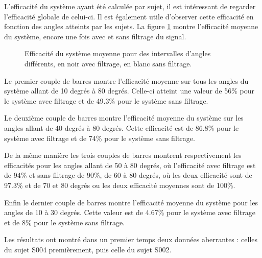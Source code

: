 \documentclass[letterpaper, twoside, 12pt, memoire, creativecommons, hyperref]{thETS}
\begin{document}
L'efficacité du système ayant été calculée par sujet, il est intéressant de regarder l'efficacité globale de celui-ci. Il est également utile d'observer cette efficacité en fonction des angles atteints par les sujets. La figure \ref{fig:compeff} montre l'efficacité moyenne du système, encore une fois avec et sans filtrage du signal. 

\begin{figure}
	\centering
	\caption{Efficacité du système moyenne pour des intervalles d'angles différents, en noir avec filtrage, en blanc sans filtrage.}
	\label{fig:compeff}
\end{figure}

Le premier couple de barres montre l'efficacité moyenne sur tous les angles du système allant de 10 degrés à 80 degrés. Celle-ci atteint une valeur de 56\% pour le système avec filtrage et de 49.3\% pour le système sans filtrage. 

Le deuxième couple de barres montre l'efficacité moyenne du système sur les angles allant de 40 degrés à 80 degrés. Cette efficacité est de 86.8\% pour le système avec filtrage et de 74\% pour le système sans filtrage. 

De la même manière les trois couples de barres montrent respectivement les efficacités pour les angles allant de 50 à 80 degrés, où l'efficacité avec filtrage est de 94\% et sans filtrage de 90\%, de 60 à 80 degrés, où les deux efficacité sont de 97.3\% et de 70 et 80 degrés ou les deux efficacité moyennes sont de 100\%. 

Enfin le dernier couple de barres montre l'efficacité moyenne du système pour les angles de 10 à 30 degrés. Cette valeur est de 4.67\% pour le système avec filtrage et de 8\% pour le système sans filtrage.

Les résultats ont montré dans un premier temps deux données aberrantes : celles du sujet S004 premièrement, puis celle du sujet S002. 
\end{document}
